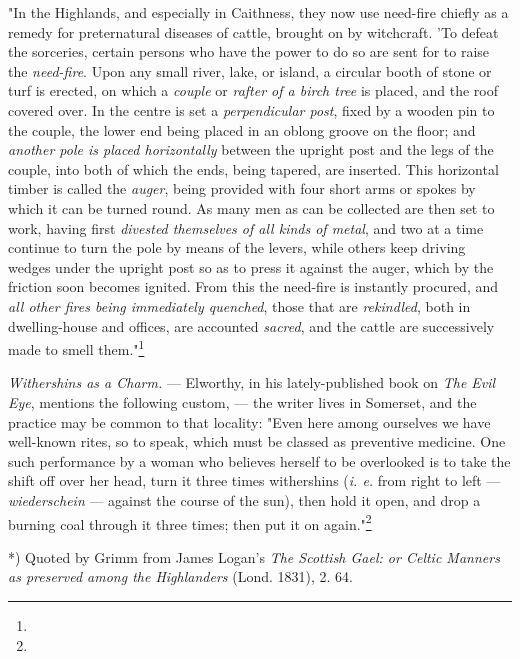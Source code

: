\documentclass[a4paper, 11pt, oneside, polutonikogreek, english]{article}
\begin{document}
"In the Highlands, and especially in Caithness, they now use need-fire chiefly as a remedy for preternatural diseases of cattle, brought on by witchcraft. 'To defeat the sorceries, certain persons who have the power to do so are sent for to raise the \emph{need-fire}. Upon any small river, lake, or island, a circular booth of stone or turf is erected, on which a \emph{couple} or \emph{rafter of a birch tree} is placed, and the roof covered over. In the centre is set a \emph{perpendicular post}, fixed by a wooden pin to the couple, the lower end being placed in an oblong groove on the floor; and \emph{another pole is placed horizontally} between the upright post and the legs of the couple, into both of which the ends, being tapered, are inserted. This horizontal timber is called the \emph{auger}, being provided with four short arms or spokes by which it can be turned round. As many men as can be collected are then set to work, having first \emph{divested themselves of all kinds of metal}, and two at a time continue to turn the pole by means of the levers, while others keep driving wedges under the upright post so as to press it against the auger, which by the friction soon becomes ignited. From this the need-fire is instantly procured, and \emph{all other fires being immediately quenched}, those that are \emph{rekindled}, both in dwelling-house and offices, are accounted \emph{sacred}, and the cattle are successively made to smell them."\footnote{}

\emph{Withershins as a Charm.} --- Elworthy, in his lately-published book on \emph{The Evil Eye}, mentions the following custom, --- the writer lives in Somerset, and the practice may be common to that locality: "Even here among ourselves we have well-known rites, so to speak, which must be classed as preventive medicine. One such performance by a woman who believes herself to be overlooked is to take the shift off over her head, turn it three times withershins (\emph{i. e.} from right to left --- \emph{wiederschein} --- against the course of the sun), then hold it open, and drop a burning coal through it three times; then put it on again."\footnote{}

*) Quoted by Grimm from James Logan's \emph{The Scottish Gael: or Celtic Manners as preserved among the Highlanders} (Lond. 1831), 2. 64.
\end{document}
